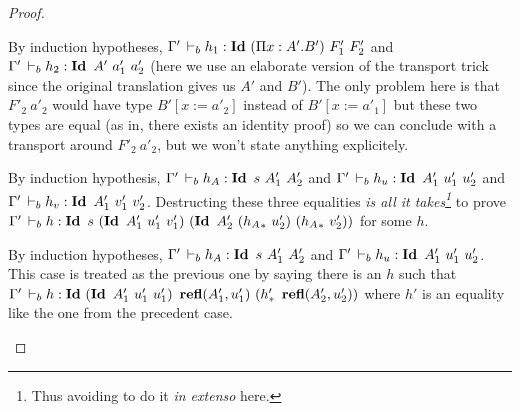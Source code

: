 \documentclass[a4paper,english]{lipics-utf8x}
\begin{document}
\begin{proof}
\begin{caselist}
      \begin{graycase}
        \begin{mathc}
        \end{mathc}
        By induction hypotheses,
        $\Gamma' \,\vdash_b h_1 : \operatorname{\mathbf{Id}~} (\Pi x:A'.B')\ F'_1\ F'_2$ and
        $\Gamma' \,\vdash_b h_2 : \operatorname{\mathbf{Id}~} A'\ a'_1\ a'_2$ (here we use an elaborate
        version of the transport trick since the original translation gives us
        $A'$ and $B'$).
        The only problem here is that $F'_2\ a'_2$ would have type
        $B'[x := a'_2]$ instead of $B'[x := a'_1]$ but these two types are equal
        (as in, there exists an identity proof) so we can conclude with a
        transport around $F'_2\ a'_2$, but we won't state anything explicitely.
      \end{graycase}

      \begin{graycase}
        \begin{mathc}
        \end{mathc}
        By induction hypothesis, $\Gamma' \,\vdash_b h_A : \operatorname{\mathbf{Id}~} s\ A'_1\ A'_2$
        and $\Gamma' \,\vdash_b h_u : \operatorname{\mathbf{Id}~} A'_1\ u'_1\ u'_2$ and
        $\Gamma' \,\vdash_b h_v : \operatorname{\mathbf{Id}~} A'_1\ v'_1\ v'_2$.
        Destructing these three equalities \emph{is all it takes\footnote{Thus
        avoiding to do it \emph{in extenso} here.}} to prove
        $\Gamma' \derb h : \Id s\ (\Id A'_1\ u'_1\ v'_1)\ %
        (\Id A'_2\ ({h_A}_*\ u'_2)\ ({h_A}_*\ v'_2))$ for some $h$.
      \end{graycase}

      \begin{graycase}
        \begin{mathc}
        \end{mathc}
        By induction hypotheses, $\Gamma' \,\vdash_b h_A : \operatorname{\mathbf{Id}~} s\ A'_1\ A'_2$
        and $\Gamma' \,\vdash_b h_u : \operatorname{\mathbf{Id}~} A'_1\ u'_1\ u'_2$.
        This case is treated as the previous one by saying there is an $h$
        such that $\Gamma' \derb h : \Id (\Id A'_1\ u'_1\ u'_1)\ %
        \refl(A'_1,u'_1)\ (h'_*\ \refl(A'_2,u'_2))$ where $h'$ is an equality
        like the one from the precedent case.
      \end{graycase}


\end{caselist}
\end{proof}
\end{document}
